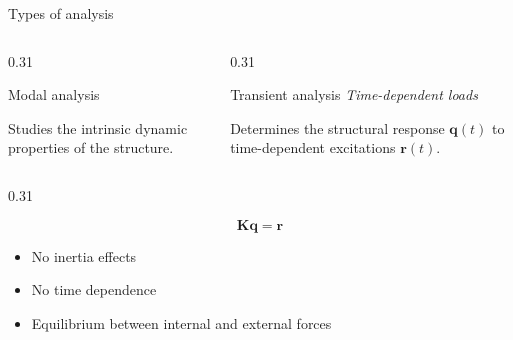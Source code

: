 \documentclass[aspectratio=169]{beamer}
\begin{document}
{\begin{frame}{Types of analysis}
\begin{columns}[T,onlytextwidth]
\begin{column}{0.31\textwidth}
\begin{block}{Modal analysis}
          \vspace{0.25cm}

          Studies the intrinsic dynamic properties of the structure.
        \end{block}
      \end{column}

      \begin{column}{0.31\textwidth}

        \begin{block}{Transient analysis}
          \centering
          \small
          \emph{Time-dependent loads}

          \vspace{0.25cm}

          Determines the structural response
          $\mathbf q(t)$ to time-dependent excitations
          $\mathbf r(t)$.
        \end{block}
      \end{column}
    \end{columns}

    \vspace{-0.5cm}

    \begin{columns}[T,onlytextwidth]
      \begin{column}{0.31\textwidth}
        \begin{block}{}
          \centering
          \small
          \[
            \mathbf K\mathbf q=\mathbf r
          \]
          \vspace{-0.45cm}
          \footnotesize
          \begin{itemize}
            \item No inertia effects
            \item No time dependence
            \item Equilibrium between internal and external forces
          \end{itemize}
        \end{block}
      \end{column}


\end{columns}
\end{frame}}
\end{document}
